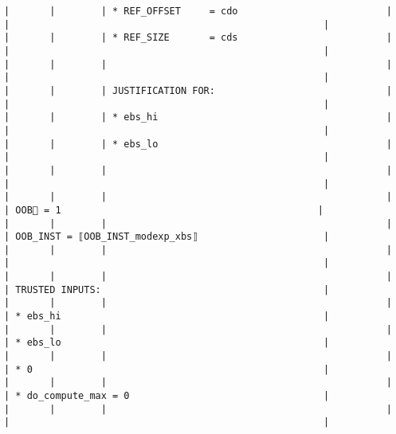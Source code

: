 \documentclass[varwidth=\maxdimen,margin=0.5cm,multi={verbatim}]{standalone}
\begin{document}
\begin{verbatim}
|       |        | * REF_OFFSET     = cdo                          |                                          |                                                       |
|       |        | * REF_SIZE       = cds                          |                                          |                                                       |
|       |        |                                                 |                                          |                                                       |
|       |        | JUSTIFICATION FOR:                              |                                          |                                                       |
|       |        | * ebs_hi                                        |                                          |                                                       |
|       |        | * ebs_lo                                        |                                          |                                                       |
|       |        |                                                 |                                          |                                                       |
|       |        |                                                 |                                          | OOB🏴 = 1                                             |
|       |        |                                                 |                                          | OOB_INST = ⟦OOB_INST_modexp_xbs⟧                      |
|       |        |                                                 |                                          |                                                       |
|       |        |                                                 |                                          | TRUSTED INPUTS:                                       |
|       |        |                                                 |                                          | * ebs_hi                                              |
|       |        |                                                 |                                          | * ebs_lo                                              |
|       |        |                                                 |                                          | * 0                                                   |
|       |        |                                                 |                                          | * do_compute_max = 0                                  |
|       |        |                                                 |                                          |                                                       |

\end{verbatim}
\end{document}

